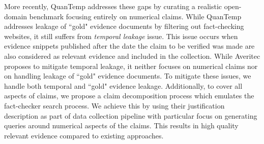 More recently, QuanTemp \cite{quantemp} addresses these gaps by curating a realistic open-domain benchmark focusing entirely on numerical claims. While QuanTemp addresses leakage of ``gold" evidence documents by filtering out fact-checking websites, it still suffers from \textit{temporal leakage} issue. This issue occurs when evidence snippets published after the date the claim to be verified was made are also considered as relevant evidence and included in the collection. While Averitec \cite{averitec} proposes to mitigate temporal leakage, it neither focuses on numerical claims nor on handling leakage of ``gold" evidence documents. To mitigate these issues, we handle both temporal and ``gold" evidence leakage. Additionally, to cover all aspects of claims, we propose a claim decomposition process which emulates the fact-checker search process. We achieve this by using their justification description as part of data collection pipeline with particular focus on generating queries around numerical aspects of the claims. This results in high quality relevant evidence compared to existing approaches.